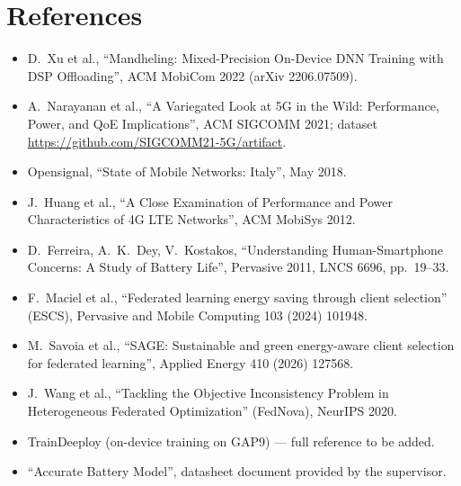 \documentclass[11pt,a4paper]{article}
\begin{document}
\section*{References}

\begin{itemize}
  \item D.~Xu et al., ``Mandheling: Mixed-Precision On-Device DNN Training
        with DSP Offloading'', ACM MobiCom 2022 (arXiv 2206.07509).
  \item A.~Narayanan et al., ``A Variegated Look at 5G in the Wild:
        Performance, Power, and QoE Implications'', ACM SIGCOMM 2021; dataset
        \url{https://github.com/SIGCOMM21-5G/artifact}.
  \item Opensignal, ``State of Mobile Networks: Italy'', May 2018.
  \item J.~Huang et al., ``A Close Examination of Performance and Power
        Characteristics of 4G LTE Networks'', ACM MobiSys 2012.
  \item D.~Ferreira, A.~K.~Dey, V.~Kostakos, ``Understanding Human-Smartphone
        Concerns: A Study of Battery Life'', Pervasive 2011, LNCS 6696,
        pp.~19--33.
  \item F.~Maciel et al., ``Federated learning energy saving through client
        selection'' (ESCS), Pervasive and Mobile Computing 103 (2024) 101948.
  \item M.~Savoia et al., ``SAGE: Sustainable and green energy-aware client
        selection for federated learning'', Applied Energy 410 (2026) 127568.
  \item J.~Wang et al., ``Tackling the Objective Inconsistency Problem in
        Heterogeneous Federated Optimization'' (FedNova), NeurIPS 2020.
  \item TrainDeeploy (on-device training on GAP9) --- full reference to be
        added.
  \item ``Accurate Battery Model'', datasheet document provided by the
        supervisor.
\end{itemize}
\end{document}
